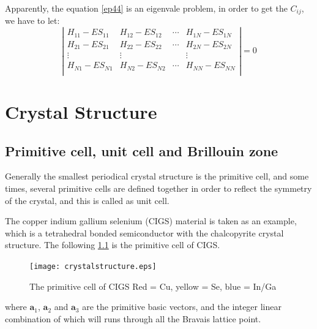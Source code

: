 \documentclass[a4paper]{report}
\begin{document}
\noindent Apparently, the equation \ref{ep44} is an eigenvale problem, in order to get the $C_{ij}$, we have to let:
\begin{equation}\label{ep4}
\left|
\begin{matrix}
    H_{11} - E S_{11} & H_{12} - E S_{12} & \cdots & H_{1N} - E S_{1N} \\
   H_{21} - E S_{21} & H_{22} - E S_{22} & \cdots & H_{2N} - E S_{2N} \\
    \vdots               & \vdots               &        & \vdots               \\
  H_{N1} - E S_{N1} & H_{N2} - E S_{N2} & \cdots & H_{NN} - E S_{NN} \\
\end{matrix} \right|
=0
\end{equation}








\chapter{Crystal Structure}
\label{ch:crystalstructure}



\section{Primitive cell, unit cell and Brillouin zone}
\noindent Generally the smallest periodical crystal structure is the primitive cell, and some times, several primitive cells are defined together
in order to reflect the symmetry of the crystal, and this is called as unit cell.

\noindent The copper indium gallium selenium (CIGS) material is taken as an example, which is a tetrahedral bonded semiconductor with the
 chalcopyrite crystal structure. The following \ref{crystr} is the primitive cell of CIGS.
\begin{figure}[h]\label{crystr}
\begin{center}
\texttt{[image: crystalstructure.eps]}
\caption{The primitive cell of CIGS Red = Cu, yellow = Se, blue = In/Ga }
\end{center}

\end{figure}


\noindent where $\textbf{a}_{1}$, $\textbf{a}_{2}$ and  $\textbf{a}_{3}$ are the primitive basic vectors, and the integer linear combination of which will runs through all the Bravais
 lattice point.
\end{document}
